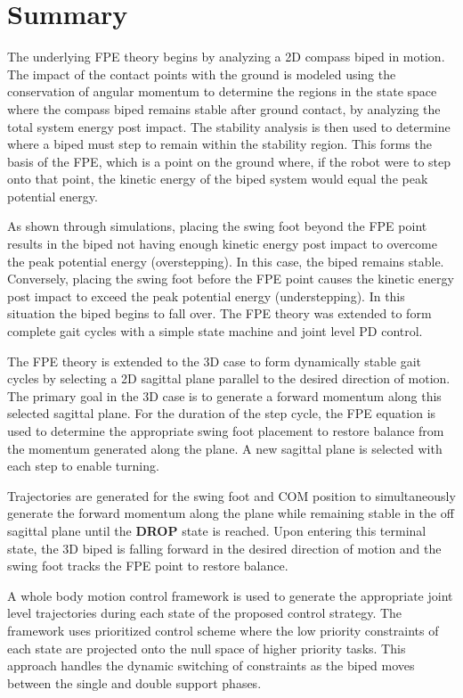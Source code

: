 \section{Summary} %
\label{sec:simulations_summary}
The underlying FPE theory begins by analyzing a 2D compass biped in motion. The impact of the contact points with the ground is modeled using the conservation of angular momentum to determine the regions in the state space where the compass biped remains stable after ground contact, by analyzing the total system energy post impact. The stability analysis is then used to determine where a biped must step to remain within the stability region. This forms the basis of the FPE, which is a point on the ground where, if the robot were to step onto that point, the kinetic energy of the biped system would equal the peak potential energy. 

As shown through simulations, placing the swing foot beyond the FPE point results in the biped not having enough kinetic energy post impact to overcome the peak potential energy (overstepping). In this case, the biped remains stable. Conversely, placing the swing foot before the FPE point causes the kinetic energy post impact to exceed the peak potential energy (understepping). In this situation the biped begins to fall over. The FPE theory was extended to form complete gait cycles with a simple state machine and joint level PD control. 

The FPE theory is extended to the 3D case to form dynamically stable gait cycles by selecting a 2D sagittal plane parallel to the desired direction of motion. The primary goal in the 3D case is to generate a forward momentum along this selected sagittal plane. For the duration of the step cycle, the FPE equation is used to determine the appropriate swing foot placement to restore balance from the momentum generated along the plane. A new sagittal plane is selected with each step to enable turning. 

Trajectories are generated for the swing foot and COM position to simultaneously generate the forward momentum along the plane while remaining stable in the off sagittal plane until the \textbf{DROP} state is reached. Upon entering this terminal state, the 3D biped is falling forward in the desired direction of motion and the swing foot tracks the FPE point to restore balance. 

A whole body motion control framework is used to generate the appropriate joint level trajectories during each state of the proposed control strategy. The framework uses prioritized control scheme where the low priority constraints of each state are projected onto the null space of higher priority tasks. This approach handles the dynamic switching of constraints as the biped moves between the single and double support phases. 


